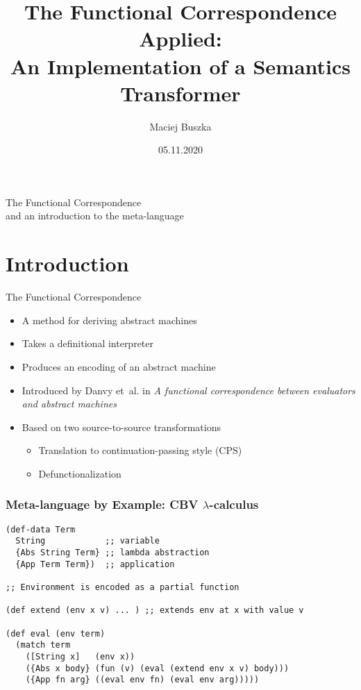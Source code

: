 \documentclass{beamer}
\title[The Functional Correspondence Applied]{The Functional Correspondence Applied:\\ An Implementation of a Semantics Transformer}
\author[Maciej Buszka]{Maciej Buszka}
\institute[II UWr]{Instytut Informatyki UWr}
\date{05.11.2020}
\newcommand{\LC}{\(\lambda\)-calculus}
\begin{document}
\begin{frame}
  \titlepage
\end{frame}

\begin{frame}
  \centering
  \LARGE{The Functional Correspondence}\\
  \tiny{and an introduction to the meta-language}
\end{frame}



\section{Introduction}
\begin{frame}{The Functional Correspondence}
  \begin{itemize}
    \item A method for deriving abstract machines\pause
    \item Takes a definitional interpreter
    \item Produces an encoding of an abstract machine\pause
    \item Introduced by Danvy et~al. in \textit{A functional correspondence between evaluators and abstract machines}
    \pause
    \item Based on two source-to-source transformations
    \begin{itemize}
      \item Translation to continuation-passing style (CPS)
      \item Defunctionalization
    \end{itemize}
  \end{itemize}
\end{frame}

\begin{frame}[fragile]
  \frametitle{Meta-language by Example: CBV \LC{}}
  \begin{lstlisting}
(def-data Term
  String            ;; variable
  {Abs String Term} ;; lambda abstraction
  {App Term Term})  ;; application

;; Environment is encoded as a partial function

(def extend (env x v) ... ) ;; extends env at x with value v

(def eval (env term)
  (match term
    ([String x]   (env x))
    ({Abs x body} (fun (v) (eval (extend env x v) body)))
    ({App fn arg} ((eval env fn) (eval env arg)))))
  \end{lstlisting}
\end{frame}
\end{document}
